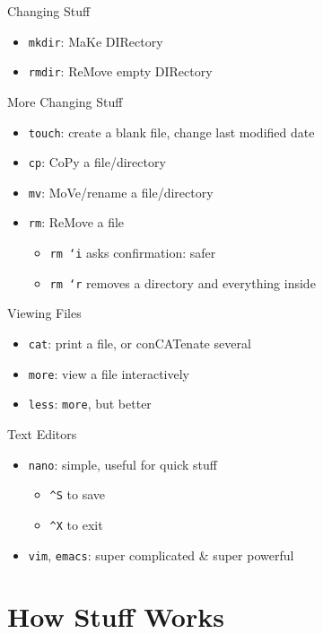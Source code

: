 \documentclass[pdf,usenames,dvipsnames,14pt]{beamer}%
\newcommand\hyphen{\char`\-}
\newcommand\textasciicaret{\textasciicircum}
\begin{document}
\begin{frame}{Changing Stuff}
	\begin{itemize}
		\item \texttt{mkdir}: MaKe DIRectory
		\item \texttt{rmdir}: ReMove empty DIRectory
	\end{itemize}
\end{frame}

\begin{frame}{More Changing Stuff}
	\begin{itemize}
		\item \texttt{touch}: create a blank file, change last modified date
		\item \texttt{cp}: CoPy a file/directory
		\item \texttt{mv}: MoVe/rename a file/directory
		\item \texttt{rm}: ReMove a file
		\begin{itemize}
			\item \texttt{rm \hyphen i} asks confirmation: safer
			\item \texttt{rm \hyphen r} removes a directory and everything inside
		\end{itemize}
	\end{itemize}
\end{frame}

\begin{frame}{Viewing Files}
	\begin{itemize}
		\item \texttt{cat}: print a file, or conCATenate several
		\item \texttt{more}: view a file interactively
		\item \texttt{less}: \texttt{more}, but better
	\end{itemize}
\end{frame}

\begin{frame}{Text Editors}
	\begin{itemize}
		\item \texttt{nano}: simple, useful for quick stuff
		\begin{itemize}
			\item \texttt{\textasciicaret S} to save
			\item \texttt{\textasciicaret X} to exit
		\end{itemize}
		\item \texttt{vim}, \texttt{emacs}: super complicated \& super powerful
	\end{itemize}
\end{frame}

\section{How Stuff Works}
\end{document}

